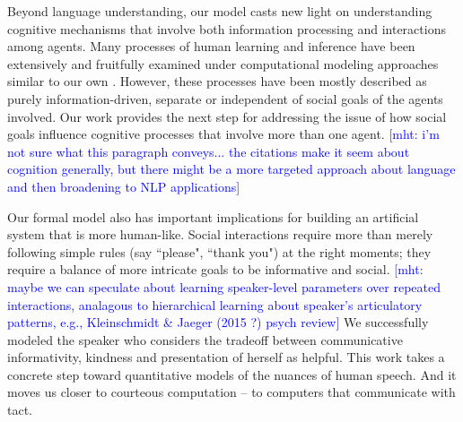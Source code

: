 \documentclass[12pt]{article}
\newcommand{\ejy}[1]{\textcolor{Red}{[ejy: #1]}}
\newcommand{\mht}[1]{\textcolor{Blue}{[mht: #1]}}
\begin{document}
Beyond language understanding, our model casts new light on understanding cognitive mechanisms 
that involve both information processing and interactions among agents. 
Many processes of human learning and inference
have been extensively and fruitfully examined under computational modeling approaches similar to our own
\cite{tenenbaum2011, xu2007, bonawitz2011, baker2009}. 
However, these processes have been mostly described as purely information-driven, 
separate or independent of social goals of the agents involved.
Our work provides the next step for addressing the issue of 
how social goals influence cognitive processes that involve more than one agent. 
\mht{i'm not sure what this paragraph conveys... the citations make it seem about cognition generally, but there might be a more targeted approach about language and then broadening to NLP applications}

Our formal model also has important implications for building an artificial system that is more human-like. 
Social interactions require more than merely following simple rules (say ``please", ``thank you") at the right moments; 
they require a balance of more intricate goals to be informative and social. 
\mht{maybe we can speculate about learning speaker-level parameters over repeated interactions, analagous to hierarchical learning about speaker's articulatory patterns, e.g., Kleinschmidt \& Jaeger (2015 ?) psych review}
We successfully modeled the speaker who considers the tradeoff between 
communicative informativity, kindness and presentation of herself as helpful. 
This work takes a concrete step toward quantitative models of the nuances of human speech. 
And it moves us closer to courteous computation -- to computers that communicate with tact.


\end{document}
